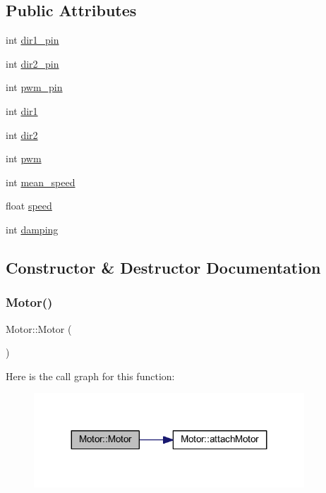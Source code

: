 \subsection*{Public Attributes}
\begin{DoxyCompactItemize}
\item 
int \hyperlink{class_motor_a73a58a00e5e1872c5ffec018fe975957}{dir1\+\_\+pin}
\item 
int \hyperlink{class_motor_adea12227392cb7a5ffe5e1878d870a9f}{dir2\+\_\+pin}
\item 
int \hyperlink{class_motor_a140443a1dcef9aef92dbfc5a8190b2a4}{pwm\+\_\+pin}
\item 
int \hyperlink{class_motor_abbca15c5ddfd452cd6a470710205afa0}{dir1}
\item 
int \hyperlink{class_motor_abb107a945dceecc4173bf7053ea8be07}{dir2}
\item 
int \hyperlink{class_motor_aef307daeabd4eee18f890b0df79c5b2b}{pwm}
\item 
int \hyperlink{class_motor_a6425f6db2380fbc7291d6866bef0b5d2}{mean\+\_\+speed}
\item 
float \hyperlink{class_motor_aee22669add18744bbddbd2bb267bce13}{speed}
\item 
int \hyperlink{class_motor_a330fe27cdd9c7fecdc1c5c7a35525f55}{damping}
\end{DoxyCompactItemize}


\subsection{Constructor \& Destructor Documentation}
\mbox{\label{class_motor_af6106b4c506411265c5face762b6c004}} 
\subsubsection{\texorpdfstring{Motor()}{Motor()}\hspace{0.1cm}{\footnotesize\ttfamily [1/2]}}
{\footnotesize\ttfamily Motor\+::\+Motor (\begin{DoxyParamCaption}{ }\end{DoxyParamCaption})}

Here is the call graph for this function\+:\nopagebreak
\begin{figure}[H]
\begin{center}
\leavevmode
\includegraphics[width=287pt]{class_motor_af6106b4c506411265c5face762b6c004_cgraph}
\end{center}
\end{figure}
\mbox{\label{class_motor_af7bad7a60264d47a368216d72704d838}} 
